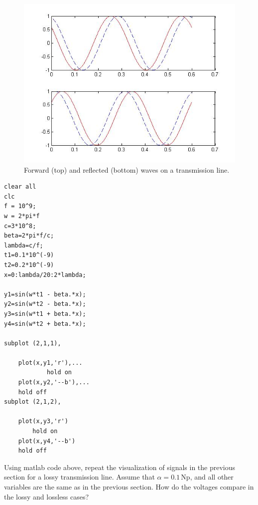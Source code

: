 \documentclass{ximera}
\begin{document}
\begin{example}
\begin{figure}[ht!]
\begin{center}
\includegraphics[scale=0.5]{../jpg/frwrdwave_01.jpg}
\caption{\label{fwrdref} Forward (top) and reflected (bottom) waves on a transmission line.}
\end{center}
\end{figure}


\begin{verbatim}
clear all
clc
f = 10^9;
w = 2*pi*f
c=3*10^8;
beta=2*pi*f/c;
lambda=c/f;
t1=0.1*10^(-9)
t2=0.2*10^(-9)
x=0:lambda/20:2*lambda;

y1=sin(w*t1 - beta.*x);
y2=sin(w*t2 - beta.*x);
y3=sin(w*t1 + beta.*x);
y4=sin(w*t2 + beta.*x);

subplot (2,1,1),

    plot(x,y1,'r'),...
            hold on
    plot(x,y2,'--b'),...
    hold off
subplot (2,1,2),

    plot(x,y3,'r')
        hold on
    plot(x,y4,'--b')
    hold off
\end{verbatim}

Using matlab code above, repeat the visualization of signals  in the previous section for a lossy transmission line. Assume that $\alpha=0.1$\,Np, and all other variables are the same as in the previous section. How do the voltages compare in the lossy and lossless cases?

\end{example}
\end{document}
